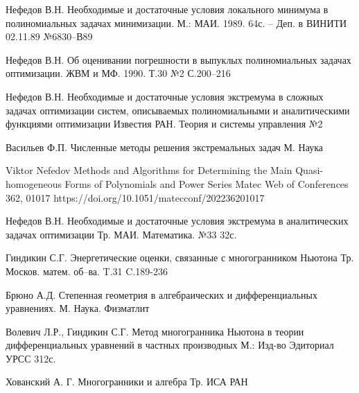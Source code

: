 \begin{thebibliography}{99}  %



\by Нефедов В.Н.													  %
\paper Необходимые и достаточные условия локального минимума в полиномиальных задачах минимизации. %
\jour М.: МАИ. 1989. 64с. – Деп. в ВИНИТИ 02.11.89 %
\issue №6830–В89  													  %


\by Нефедов В.Н.
\paper Об оценивании погрешности в выпуклых полиномиальных задачах 
оптимизации.
\jour  ЖВМ и МФ. 1990. 
\vol Т.30
\issue №2
\pages С.200--216


\by Нефедов В.Н.
\paper Необходимые и достаточные условия экстремума в сложных задачах оптимизации систем, описываемых полиномиальными и аналитическими функциями
оптимизации
\jour Известия РАН. Теория и системы управления
\issue №2


\by Васильев Ф.П. 
\book Численные методы решения экстремальных задач
\publaddr М.
\publ Наука


\by Viktor Nefedov
\paper Methods and Algorithms for Determining the Main Quasi-homogeneous Forms of Polynomials and Power Series
\jour Matec Web of Conferences 362, 01017
\URL https://doi.org/10.1051/matecconf/202236201017


\by Нефедов В.Н. 
\paper Необходимые и достаточные условия экстремума в аналитических задачах оптимизации
\jour Тр. МАИ. Математика.
\vol №33
\pages 32с.


\by Гиндикин С.Г. 
\paper Энергетические оценки, связанные с многогранником Ньютона
\jour Тр. Москов. матем. об–ва.
\vol T.31
\pages C.189-236

\by Брюно А.Д. 
\book Степенная геометрия в алгебраических и дифференциальных уравнениях.
\publaddr М.
\publ Наука. Физматлит

\by Волевич Л.Р.,
Гиндикин С.Г.
\paper Метод многогранника Ньютона в теории дифференциальных уравнений в частных производных
\jour М.: Изд-во Эдиториал УРСС
\pages 312с.

\by Хованский А. Г.
\book Многогранники и алгебра  
\publ Тр. ИСА РАН


\end{thebibliography}
